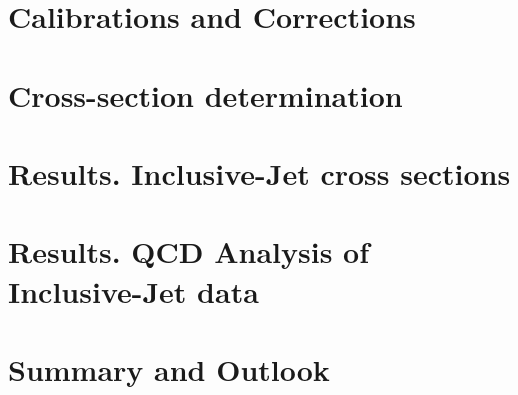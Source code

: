 \documentclass[12pt,a4paper,reqno,twoside,final]{scrbook}%
\numberwithin{equation}{subsection}
\begin{document}
 \chapter{Calibrations and Corrections}
 \label{ch:calibcorr}
 

 \chapter{Cross-section determination}
 \label{ch:unfolding}
 

\chapter{Results. Inclusive-Jet cross sections}
\label{ch:resultscs}
 

\chapter{Results. QCD Analysis of Inclusive-Jet data}
\label{ch:resultsqcdfit}


\newpage
\chapter*{Summary and Outlook}
\label{ch:summary}

\end{document}
